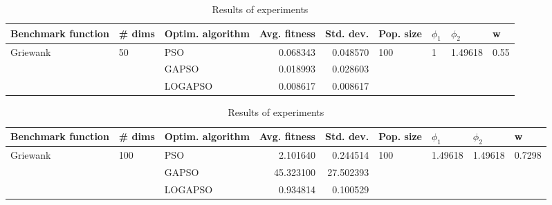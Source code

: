 \documentclass{article}
\begin{document}
\begin{table}
\centering
\caption{Results of experiments}
\begin{tabular}{lllrrllll}
\toprule
       Benchmark function &             \# dims & Optim. algorithm &  Avg. fitness &  Std. dev. &            Pop. size &         $\phi_{1}$ &               $\phi_{2}$ &                     w \\
\midrule
\multirow{3}{*}{Griewank} & \multirow{3}{*}{50} &              PSO &      0.068343 &   0.048570 & \multirow{3}{*}{100} & \multirow{3}{*}{1} & \multirow{3}{*}{1.49618} & \multirow{3}{*}{0.55} \\
                          &                     &            GAPSO &      0.018993 &   0.028603 &                      &                    &                          &                       \\
                          &                     &          LOGAPSO &      0.008617 &   0.008617 &                      &                    &                          &                       \\
\bottomrule
\end{tabular}
\end{table}
\begin{table}
\centering
\caption{Results of experiments}
\begin{tabular}{lllrrllll}
\toprule
       Benchmark function &              \# dims & Optim. algorithm &  Avg. fitness &  Std. dev. &            Pop. size &               $\phi_{1}$ &               $\phi_{2}$ &                       w \\
\midrule
\multirow{3}{*}{Griewank} & \multirow{3}{*}{100} &              PSO &      2.101640 &   0.244514 & \multirow{3}{*}{100} & \multirow{3}{*}{1.49618} & \multirow{3}{*}{1.49618} & \multirow{3}{*}{0.7298} \\
                          &                      &            GAPSO &     45.323100 &  27.502393 &                      &                          &                          &                         \\
                          &                      &          LOGAPSO &      0.934814 &   0.100529 &                      &                          &                          &                         \\
\bottomrule
\end{tabular}
\end{table}
\end{document}
